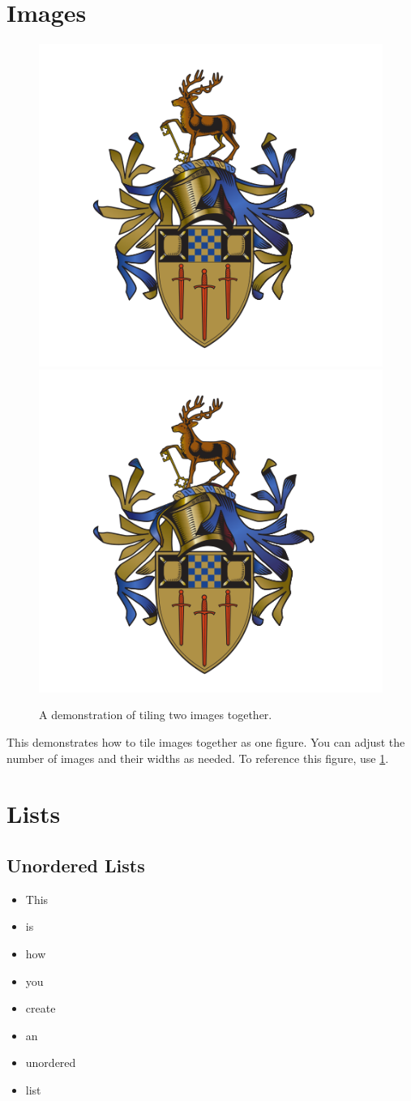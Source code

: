 \section{Images}
\begin{figure}[!ht]
    \centering
    \includegraphics[width=.49\linewidth]{Figures/Surrey Logo.png}
    \includegraphics[width=.49\linewidth]{Figures/Surrey Logo.png}
    \caption{A demonstration of tiling two images together.}
    \label{fig:somefigure}
\end{figure}

This demonstrates how to tile images together as one figure. You can adjust the number of images and their widths as needed. To reference this figure, use \ref{fig:somefigure}.

\section{Lists}
\subsection{Unordered Lists}
\begin{itemize}
    \item This
    \item is
    \item how
    \item you
    \item create
    \item an
    \item unordered
    \item list
\end{itemize}

